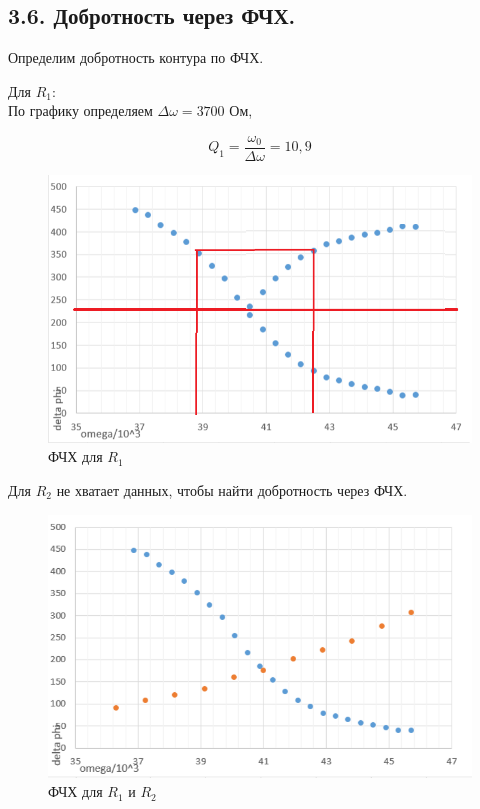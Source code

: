 \documentclass[a4paper,12pt]{article}
\begin{document}
\subsection*{3.6. Добротность через ФЧХ.}

Определим добротность контура по ФЧХ.

Для $R_1$:\\
По графику определяем $\Delta\omega = 3700$ Ом, 

$$
Q_1 = \frac{\omega_0}{\Delta\omega} = 10,9
$$

\begin{figure}[h]
    \includegraphics[scale=0.6]{4.png}
    \centering
    \caption{ФЧХ для $R_1$}
\end{figure}

Для $R_2$ не хватает данных, чтобы найти добротность через ФЧХ.

\newpage

\begin{figure}[h]
    \includegraphics[scale=0.6]{5.png}
    \centering
    \caption{ФЧХ для $R_1$ и $R_2$}
\end{figure}
\end{document}
